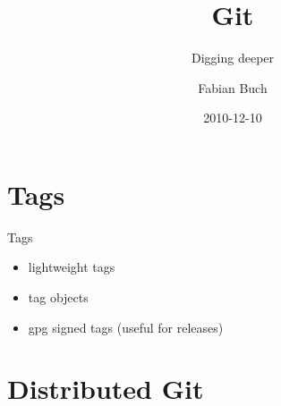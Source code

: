 \documentclass{beamer}
\title[] %
{Git}
\subtitle
{Digging deeper}
\author[] %
{Fabian Buch}
\institute[] %
{Synyx GmbH \& Co. KG}
\date[] %
{2010-12-10}
\begin{document}



\begin{frame}
  \titlepage
\end{frame}







\section{Tags}

\begin{frame}{Tags}
  \begin{itemize}
  \item
    lightweight tags
  \item
    tag objects
  \item
    gpg signed tags (useful for releases)
  \end{itemize}
\end{frame}

\section{Distributed Git}
\end{document}
